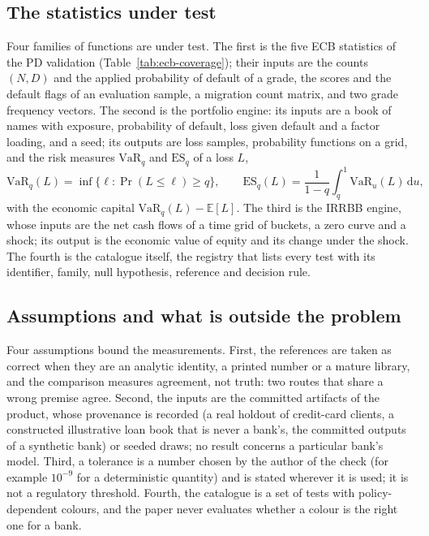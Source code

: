 \subsection{The statistics under test}

Four families of functions are under test. The first is the five ECB statistics of the PD validation (Table~\ref{tab:ecb-coverage}); their inputs are the counts $(N,D)$ and the applied probability of default of a grade, the scores and the default flags of an evaluation sample, a migration count matrix, and two grade frequency vectors. The second is the portfolio engine: its inputs are a book of names with exposure, probability of default, loss given default and a factor loading, and a seed; its outputs are loss samples, probability functions on a grid, and the risk measures $\mathrm{VaR}_q$ and $\mathrm{ES}_q$ of a loss $L$,
\begin{equation}
  \mathrm{VaR}_q(L)=\inf\{\ell:\Pr(L\le\ell)\ge q\},\qquad
  \mathrm{ES}_q(L)=\frac{1}{1-q}\int_q^1\mathrm{VaR}_u(L)\,\mathrm{d}u,
  \label{eq:varES}
\end{equation}
with the economic capital $\mathrm{VaR}_q(L)-\mathbb{E}[L]$. The third is the IRRBB engine, whose inputs are the net cash flows of a time grid of buckets, a zero curve and a shock; its output is the economic value of equity and its change under the shock. The fourth is the catalogue itself, the registry that lists every test with its identifier, family, null hypothesis, reference and decision rule.

\subsection{Assumptions and what is outside the problem}

Four assumptions bound the measurements. First, the references are taken as correct when they are an analytic identity, a printed number or a mature library, and the comparison measures agreement, not truth: two routes that share a wrong premise agree. Second, the inputs are the committed artifacts of the product, whose provenance is recorded (a real holdout of credit-card clients, a constructed illustrative loan book that is never a bank's, the committed outputs of a synthetic bank) or seeded draws; no result concerns a particular bank's model. Third, a tolerance is a number chosen by the author of the check (for example $10^{-9}$ for a deterministic quantity) and is stated wherever it is used; it is not a regulatory threshold. Fourth, the catalogue is a set of tests with policy-dependent colours, and the paper never evaluates whether a colour is the right one for a bank.

